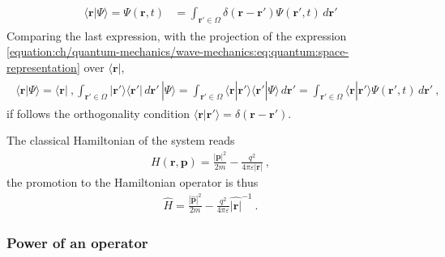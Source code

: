 \documentclass[letterpaper,10pt,english]{jupyterBook}
\begin{document}
\begin{equation*}
\begin{split}\begin{aligned}
  \langle \mathbf{r} | \Psi \rangle = \Psi(\mathbf{r},t)
  & = \int_{\mathbf{r}' \in \Omega} \delta(\mathbf{r} - \mathbf{r}') \Psi(\mathbf{r}',t) \, d \mathbf{r}'
\end{aligned}\end{split}
\end{equation*}
\sphinxAtStartPar
Comparing the last expression, with the projection of the expression \eqref{equation:ch/quantum-mechanics/wave-mechanics:eq:quantum:space-representation} over \(\langle \mathbf{r} |\),
\begin{equation*}
\begin{split}\begin{aligned}
  \langle \mathbf{r} | \Psi \rangle = \langle \mathbf{r} |  \ , \int_{\mathbf{r}' \in \Omega} | \mathbf{r}' \rangle \langle \mathbf{r}' | \, d \mathbf{r}' \, | \Psi \rangle = \int_{\mathbf{r}' \in \Omega} \langle \mathbf{r} | \mathbf{r}' \rangle \langle \mathbf{r}' | \Psi \rangle \,  d \mathbf{r}' = \int_{\mathbf{r}' \in \Omega} \langle \mathbf{r} | \mathbf{r}' \rangle \Psi(\mathbf{r'},t ) \,  d \mathbf{r}' \ ,
\end{aligned}\end{split}
\end{equation*}
\sphinxAtStartPar
if follows the orthogonality condition \(\langle \mathbf{r} | \mathbf{r}' \rangle = \delta(\mathbf{r} - \mathbf{r}')\).

\sphinxAtStartPar
The classical Hamiltonian of  the system reads
\begin{equation*}
\begin{split}H(\mathbf{r}, \mathbf{p}) = \frac{| \mathbf{p} |^2 }{2m} - \frac{q^2}{4 \pi \varepsilon | \mathbf{r} |} \ ,\end{split}
\end{equation*}
\sphinxAtStartPar
the promotion to the Hamiltonian operator is thus
\begin{equation*}
\begin{split}\hat{H} = \frac{| \hat{\mathbf{p}} |^2}{2 m } - \frac{q^2}{4 \pi \varepsilon} \hat{|\mathbf{r}|}^{-1} \ .\end{split}
\end{equation*}\subsubsection*{Power of an operator}
\end{document}
